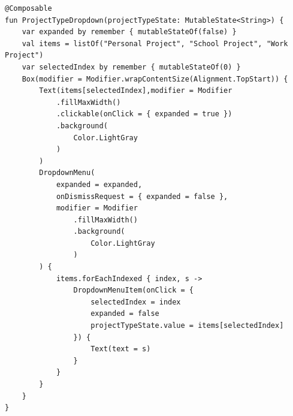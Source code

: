 \documentclass[12pt]{article}
\begin{document}
\begin{lstlisting}[numbers=none, 
			caption=DropDown box,
			label={lst:projectDropDown}]
@Composable
fun ProjectTypeDropdown(projectTypeState: MutableState<String>) {
    var expanded by remember { mutableStateOf(false) }
    val items = listOf("Personal Project", "School Project", "Work Project")
    var selectedIndex by remember { mutableStateOf(0) }
    Box(modifier = Modifier.wrapContentSize(Alignment.TopStart)) {
        Text(items[selectedIndex],modifier = Modifier
            .fillMaxWidth()
            .clickable(onClick = { expanded = true })
            .background(
                Color.LightGray
            )
        )
        DropdownMenu(
            expanded = expanded,
            onDismissRequest = { expanded = false },
            modifier = Modifier
                .fillMaxWidth()
                .background(
                    Color.LightGray
                )
        ) {
            items.forEachIndexed { index, s ->
                DropdownMenuItem(onClick = {
                    selectedIndex = index
                    expanded = false
                    projectTypeState.value = items[selectedIndex]
                }) {
                    Text(text = s)
                }
            }
        }
    }
}
\end{lstlisting}
\end{document}
